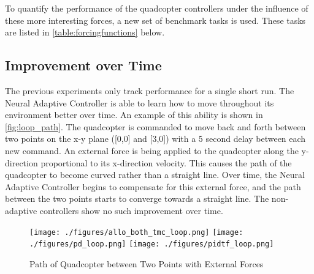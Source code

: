 \documentclass[letterpaper,12pt,titlepage,oneside,final]{book}
\begin{document}
To quantify the performance of the quadcopter controllers under the influence of these more interesting forces, a new set of benchmark tasks is used.
These tasks are listed in \autoref{table:forcingfunctions} below. %




\subsection{Improvement over Time} %

The previous experiments only track performance for a single short run. 
The Neural Adaptive Controller is able to learn how to move throughout its environment better over time.
An example of this ability is shown in \autoref{fig:loop_path}.
The quadcopter is commanded to move back and forth between two points on the x-y plane ([0,0] and [3,0]) with a 5 second delay between each new command.
An external force is being applied to the quadcopter along the y-direction proportional to its x-direction velocity.
This causes the path of the quadcopter to become curved rather than a straight line.
Over time, the Neural Adaptive Controller begins to compensate for this external force, and the path between the two points starts to converge towards a straight line.
The non-adaptive controllers show no such improvement over time.

\begin{figure}
\centering
\texttt{[image: ./figures/allo\_both\_tmc\_loop.png]}
\texttt{[image: ./figures/pd\_loop.png]}
\texttt{[image: ./figures/pidtf\_loop.png]}
\caption{Path of Quadcopter between Two Points with External Forces} %
\label{fig:loop_path}
\end{figure}
\end{document}
